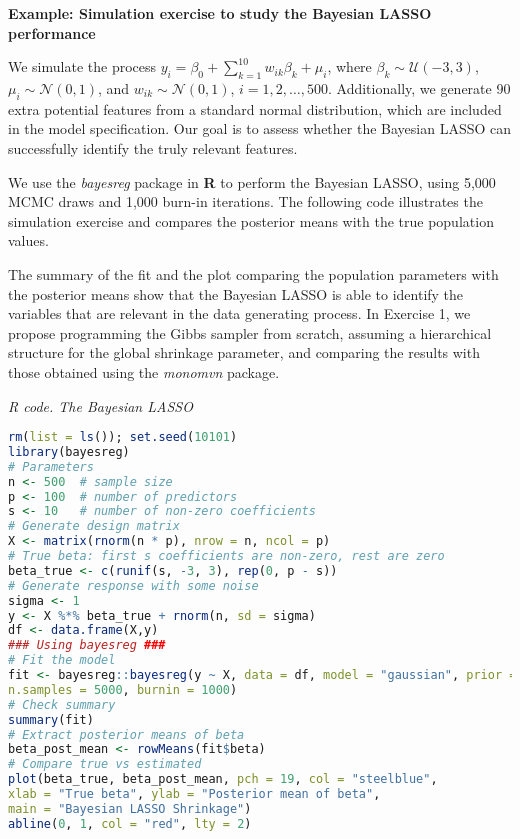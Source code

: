 \textbf{Example: Simulation exercise to study the Bayesian LASSO performance}

We simulate the process \( y_i = \beta_0 + \sum_{k=1}^{10} w_{ik} \beta_k + \mu_i \), where \( \beta_k \sim \mathcal{U}(-3, 3) \), \( \mu_i \sim \mathcal{N}(0, 1) \), and \( w_{ik} \sim \mathcal{N}(0, 1) \), $i=1,2,\dots,500$. Additionally, we generate 90 extra potential features from a standard normal distribution, which are included in the model specification. Our goal is to assess whether the Bayesian LASSO can successfully identify the truly relevant features.

We use the \textit{bayesreg} package in \textbf{R} to perform the Bayesian LASSO, using 5,000 MCMC draws and 1,000 burn-in iterations. The following code illustrates the simulation exercise and compares the posterior means with the true population values.

The summary of the fit and the plot comparing the population parameters with the posterior means show that the Bayesian LASSO is able to identify the variables that are relevant in the data generating process. In Exercise 1, we propose programming the Gibbs sampler from scratch, assuming a hierarchical structure for the global shrinkage parameter, and comparing the results with those obtained using the \textit{monomvn} package.

\begin{tcolorbox}[enhanced,width=4.67in,center upper,
	fontupper=\large\bfseries,drop shadow southwest,sharp corners]
	\textit{R code. The Bayesian LASSO}
	\begin{VF}
		\begin{lstlisting}[language=R]
rm(list = ls()); set.seed(10101)
library(bayesreg)
# Parameters
n <- 500  # sample size
p <- 100  # number of predictors
s <- 10   # number of non-zero coefficients
# Generate design matrix
X <- matrix(rnorm(n * p), nrow = n, ncol = p)
# True beta: first s coefficients are non-zero, rest are zero
beta_true <- c(runif(s, -3, 3), rep(0, p - s))
# Generate response with some noise
sigma <- 1
y <- X %*% beta_true + rnorm(n, sd = sigma)
df <- data.frame(X,y)
### Using bayesreg ###
# Fit the model
fit <- bayesreg::bayesreg(y ~ X, data = df, model = "gaussian", prior = "lasso", 
n.samples = 5000, burnin = 1000)
# Check summary
summary(fit)
# Extract posterior means of beta
beta_post_mean <- rowMeans(fit$beta)
# Compare true vs estimated
plot(beta_true, beta_post_mean, pch = 19, col = "steelblue",
xlab = "True beta", ylab = "Posterior mean of beta",
main = "Bayesian LASSO Shrinkage")
abline(0, 1, col = "red", lty = 2)
\end{lstlisting}
	\end{VF}
\end{tcolorbox}
  
